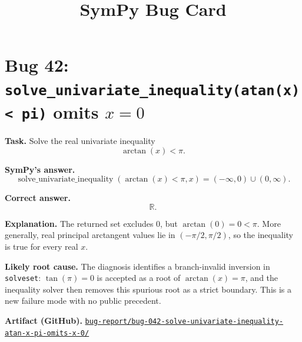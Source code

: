 \documentclass[11pt]{article}
\title{SymPy Bug Card}
\author{}
\date{}
\newcommand{\artifactrepo}{https://github.com/TODO-org/TODO-repo}
\newcommand{\bugbundle}[1]{\href{\artifactrepo/tree/main/bug-report/#1}{\nolinkurl{bug-report/#1/}}}
\begin{document}
\maketitle

\section*{Bug 42: \texorpdfstring{\texttt{solve\_univariate\_inequality(atan(x) < pi)}}{solve\_univariate\_inequality(atan(x) < pi)} omits \texorpdfstring{\(x=0\)}{x=0}}

\begin{counterexamplebox}
\textbf{Task.} Solve the real univariate inequality
\[
\arctan(x)<\pi .
\]

\medskip
\textbf{SymPy's answer.}
\[
\operatorname{solve\_univariate\_inequality}(\arctan(x)<\pi,x)
  =(-\infty,0)\cup(0,\infty).
\]

\medskip
\textbf{Correct answer.}
\[
\mathbb{R}.
\]

\medskip
\textbf{Explanation.} The returned set excludes \(0\), but
\(\arctan(0)=0<\pi\).  More generally, real principal arctangent values lie in
\((-\pi/2,\pi/2)\), so the inequality is true for every real \(x\).

\medskip
\textbf{Likely root cause.} The diagnosis identifies a branch-invalid inversion
in \texttt{solveset}: \(\tan(\pi)=0\) is accepted as a root of
\(\arctan(x)=\pi\), and the inequality solver then removes this spurious root as
a strict boundary.  This is a new failure mode with no public precedent.

\medskip
\textbf{Artifact (GitHub).} \bugbundle{bug-042-solve-univariate-inequality-atan-x-pi-omits-x-0}
\end{counterexamplebox}
\end{document}
